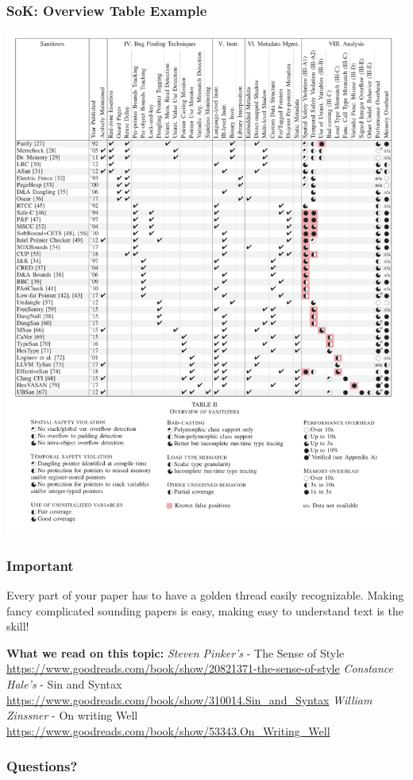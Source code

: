 \documentclass[xcolor={usenames,dvipsnames}]{beamer}
\begin{document}
\begin{frame}
	\frametitle{SoK: Overview Table Example}

	\begin{center}
		\includegraphics[scale=0.25]{sok-table.png}
	\end{center}
\end{frame}

%

\begin{frame}
	\frametitle{Important}
	\alert{Every part of your paper has to have a golden thread easily recognizable.}\newline\newline
	\alert{Making fancy complicated sounding papers is easy, making easy to understand text is the skill!}\newline

	\textbf{What we read on this topic:}\newline
	\emph{Steven Pinker's} - The Sense of Style \url{https://www.goodreads.com/book/show/20821371-the-sense-of-style}\newline\newline
	\emph{Constance Hale's} - Sin and Syntax \url{https://www.goodreads.com/book/show/310014.Sin_and_Syntax}\newline\newline
	\emph{William Zinssner} - On writing Well \url{https://www.goodreads.com/book/show/53343.On_Writing_Well}
\end{frame}

\begin{frame}
	\frametitle{Questions?}
\end{frame}
\end{document}
